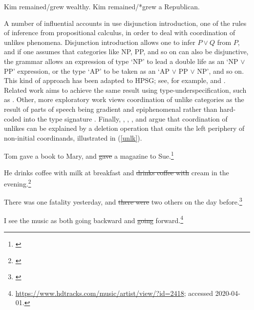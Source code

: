 \eal
\label{republican}
\ex  Kim remained/grew wealthy.
\ex  Kim remained/*grew a Republican.
\zl



\eal
\label{show2}
\zl


A number of influential accounts in 
\citep{morrill90,morrill94,bayer}
use  disjunction introduction, one of the rules of
inference from propositional calculus,  in order to deal with
coordination of unlikes phenomena. Disjunction introduction 
 allows  one to infer $P \vee Q$ from  $P$, and if one assumes
 that categories like NP, PP, and so on can also be disjunctive, the grammar allows an expression of type `NP' to lead a double life as an `NP $\vee$ PP' expression,
or the type `AP' to be taken as an `AP $\vee$ PP $\vee$ NP', and so
on. This kind of approach has been adapted to HPSG; see, for example, \citet{Daniels02} and  \citet{Yatabe:04}.
Related work aims to achieve the same result using type-underspecification, such as 
 \citet{Sag:03}. Other, more exploratory work views coordination of unlike categories as the result of parts of speech being gradient and  epiphenomenal rather than hard-coded into the type signature \citep{Chaves2013b-u}. Finally, \citet{berthold0}, \citet{yatabe},  \citet{Beavers}, and \citet{chaves06}  argue that
coordination of unlikes can be explained by
a deletion operation that omits the left periphery of
non-initial coordinands, illustrated in   (\ref{unlk}).

\eal
\label{unlk}
\ex Tom gave a book to Mary, and \sout{gave} a magazine to Sue.\footnote{\citep[]{Chaves2013b-u}}

\ex He drinks coffee with milk at breakfast and \sout{drinks coffee with} cream in the evening.\footnote{\citep[]{hudson84}}

\ex There was one fatality yesterday, and \sout{there were} two others on the day
before.\footnote{\citep[339]{chavesthesis}}

\ex I see the music as both going backward and \sout{going} forward.\footnote{
\url{https://www.hdtracks.com/music/artist/view/?id=2418}; accessed 2020-04-01.}
\zl


